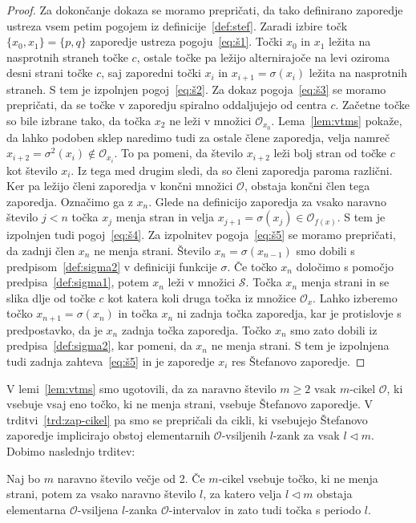 \documentclass[../TG_magistrsko_delo_sections.tex]{subfiles}
\begin{document}
\begin{proof}
Za dokončanje dokaza se moramo prepričati, da tako definirano zaporedje ustreza vsem petim pogojem iz definicije~\ref{def:stef}.
Zaradi izbire točk $\{x_0, x_1\} = \{p, q\}$ zaporedje ustreza pogoju~\ref{eq:š1}.
Točki $x_0$ in $x_1$ ležita na nasprotnih straneh točke $c$, ostale točke pa ležijo alternirajoče na levi oziroma desni strani točke $c$, saj zaporedni točki $x_i$ in $x_{i+1}=\sigma(x_i)$ ležita na nasprotnih straneh. S tem je izpolnjen pogoj~\ref{eq:š2}.
Za dokaz pogoja~\ref{eq:š3} se moramo prepričati, da se točke v zaporedju spiralno oddaljujejo od centra $c$. Začetne točke so bile izbrane tako, da točka $x_2$ ne leži v množici $\mathcal{O}_{x_0}$. Lema~\ref{lem:vtms} pokaže, da lahko podoben sklep naredimo tudi za ostale člene zaporedja, velja namreč $x_{i+2} = \sigma^2(x_i) \notin \mathcal{O}_{x_i}$. To pa pomeni, da število $x_{i+2}$ leži bolj stran od točke $c$ kot število $x_i$. Iz tega med drugim sledi, da so členi zaporedja paroma različni. Ker pa ležijo členi zaporedja v končni množici $\mathcal{O}$, obstaja končni člen tega zaporedja. Označimo ga z $x_n$.
Glede na definicijo zaporedja za vsako naravno število $j<n$ točka $x_j$ menja stran in velja $x_{j+1} = \sigma(x_j) \in \mathcal{O}_{f(x)}$. S tem je izpolnjen tudi pogoj~\ref{eq:š4}.
Za izpolnitev pogoja~\ref{eq:š5} se moramo prepričati, da zadnji člen $x_n$ ne menja strani. Število $x_n=\sigma(x_{n-1})$ smo dobili s predpisom~\ref{def:sigma2} v definiciji funkcije $\sigma$. Če točko $x_n$ določimo s pomočjo predpisa~\ref{def:sigma1}, potem $x_n$ leži v množici $\mathcal{S}$. Točka $x_n$ menja strani in se slika dlje od točke $c$ kot katera koli druga točka iz množice $\mathcal{O}_x$. Lahko izberemo točko $x_{n+1} = \sigma(x_n)$ in točka $x_n$ ni zadnja točka zaporedja, kar je protislovje s predpostavko, da je $x_n$ zadnja točka zaporedja. Točko $x_n$ smo zato dobili iz predpisa~\ref{def:sigma2}, kar pomeni, da $x_n$ ne menja strani. S tem je izpolnjena tudi zadnja zahteva~\ref{eq:š5} in je zaporedje $x_i$ res Štefanovo zaporedje. 
\end{proof}
V lemi~\ref{lem:vtms} smo ugotovili, da za naravno število $m \geq 2$ vsak $m$-cikel $\mathcal{O}$, ki vsebuje vsaj eno točko, ki ne menja strani, vsebuje Štefanovo zaporedje. V trditvi~\ref{trd:zap-cikel} pa smo se prepričali da cikli, ki vsebujejo Štefanovo zaporedje implicirajo obstoj elementarnih $\mathcal{O}$-vsiljenih $l$-zank za vsak $l\triangleleft m$. Dobimo naslednjo trditev: 

\begin{trditev}\label{trd:tnmsoc}
Naj bo $m$ naravno število večje od 2. Če $m$-cikel vsebuje točko, ki ne menja strani, potem za vsako naravno število $l$, za katero velja $l \triangleleft m$ obstaja elementarna $\mathcal{O}$-vsiljena $l$-zanka $\mathcal{O}$-intervalov in zato tudi točka s periodo $l$.
\end{trditev}
\end{document}
